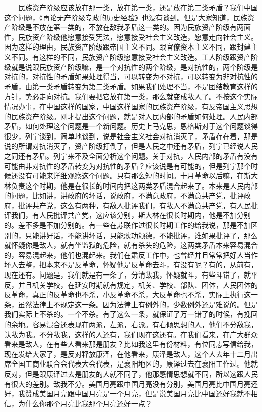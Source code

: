 \documentclass[cn,11pt,chinese]{elegantbook}
\begin{document}
　　民族资产阶级应该放在那一类，放在第一类，还是放在第二类矛盾？我们中国这个问题，《再论无产阶级专政的历史经验》也没有谈到。但是大家知道，民族资产阶级是不放在第一类的，不放在敌我矛盾这一类的。因为民族资产阶级有两面性，民族资产阶级他愿意接受宪法，愿意接受社会主义改造，愿意走向社会主义。因为这样的理由，民族资产阶级跟帝国主义不同。跟官僚资本主义不同，跟封建主义不同。有这样的不同，民族资产阶级愿意接受社会主义改造。工人阶级跟资产阶级就是说跟民族资产阶级嘛，是一个对抗性的两个阶级，是对抗性的，两个阶级是对抗的，对抗性的矛盾如果处理得当，可以转变为不对抗，可以转变为非对抗性的矛盾，由第一类矛盾转变为第二类矛盾。如果我们处理不当，不是团结教育这样的方针，势必走向对抗。我们要把它放在第一类，那么就变成敌人了。不按这个实际情况办事，在中国这样的国家，中国这样国家的民族资产阶级，有反帝国主义思想的民族资产阶级。刚才提出这个问题，就是对人民内部的矛盾如何处理。人民内部矛盾，如何处理这个问题是一个新问题。历史上马克思，恩格斯对于这个问题谈得很少，列宁谈到，简单地谈到，说是社会主义社会对抗消灭了，矛盾存在着，那是说的所谓对抗消灭了，资产阶级打倒了，但是人民之中还有矛盾，列宁已经说人民之同还有矛盾。列宁来不及全面分析这个问题。关于对抗，人民内部的矛盾有没有可能由非对抗性的矛盾转变为对抗性的矛盾？应该说是有可能的，但是列宁那个时候还没有可能来详细观察这个问题。只有那么短的时间。十月革命以后嘛，在斯大林负责这个时期，他是在很长的时间内把这两类矛盾混合起来了。本来是人民内部的问题，比如讲，讲政府的坏话，说政府，不满意政府，不满意共产党，批评政府，批评共产党，这么有两种，有敌人批评我们，有敌人不满意共产党，有人民批评我们，有人民批评共产党，这应该分别，斯大林在很长时期内，他是不加分别的。差不多是不加分别的。有一些在苏联作过很长时期工作的给我说，那是不加区别的，只能讲好话，不能讲坏话，只能歌功颂德，不能批评，谁如果批评了，那么就怀疑你是敌人，就有坐监狱的危险，就有杀头的危险，这两类矛盾本来容易混合的，容易混起来，他们也混起来。我们在肃反工作中，也曾经并且常常把好人当作坏人去整，把本来不是反革命，怀疑他是反革命去斗，有没有呢？有的，从前有，现在还有。问题是，我们就是有一条了，分清敌我，怀疑就斗，有些斗错了，就平反，并且机关学校，在延安时期就有规定，机关、学校、部队、团体，人民团体的反革命，真正的反革命也不杀，小反革命不杀，大反革命也不杀，实际上执行这一条，虽然法律上不规定这一条。因为法律上有例外的，少数例外还是难说的。但是我们实际上不杀的。一个不杀。有了这么一条，就保证了万一错了的时候，有挽回的余地。容易混合还表现在两派，左派，右派。有右倾思想的人，他们不分敌我，认敌为我。不分敌我，这样的人还有，我们现在这还有。在我们看来，在广大群众看来是敌人，在有些人看来那是朋友？比如我这里有份材料，有位同志写信给我，现在发给大家了，是反对释放康泽，在他看来，康泽是敌人，这个人去年十二月出席全国工商业联合会代表大会代表，是襄阳地区的，康译过去在襄阳工作过。他就反对，但是跟康译过去是朋友的人就不同了，他那感情思想就不同，所以这跟人民有很大的差别。敌我不分。美国月亮跟中国月亮没有分别，美国月亮比中国月亮还好，我赞成美国月亮跟中国月亮是一个月亮，但是说美国月亮比中国还好我就不相信，为什么你那个月亮比我那个月亮还好一点？\\
\end{document}

